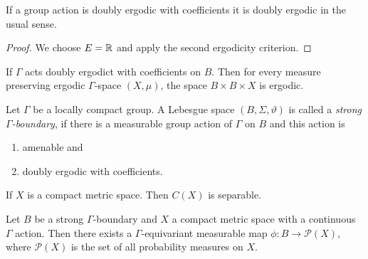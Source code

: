 \begin{prop}
  If a group action is doubly ergodic with coefficients it is doubly ergodic in the usual sense.
\end{prop}

\begin{proof}
  We choose \(E = \mathbb{R}\) and apply the second ergodicity criterion.
\end{proof}

\begin{lemma}
  \label{lem:coeff-product}
  If \(\Gamma\) acts doubly ergodict with coefficients on \(B\). Then for every measure preserving ergodic \(\Gamma\)-space \((X, \mu)\), the space \(B \times B \times X\) is ergodic.
\end{lemma}

\begin{defin}
  Let \(\Gamma\) be a locally compact group. A Lebesgue space \((B, \Sigma, \vartheta)\) is called a \emph{strong \(\Gamma\)-boundary}, if there is a measurable group action of \(\Gamma\) on \(B\) and this action is
  \begin{enumerate}
  \item amenable and
  \item doubly ergodic with coefficients.
  \end{enumerate}
\end{defin}

\begin{lemma}
  If \(X\) is a compact metric space. Then \(C(X)\) is separable.
\end{lemma}

\begin{thm}
  Let \(B\) be a strong \(\Gamma\)-boundary and \(X\) a compact metric space with a continuous \(\Gamma\) action. Then there exists a \(\Gamma\)-equivariant measurable map \(\phi \colon B \to \mathcal{P}(X)\), where \(\mathcal{P}(X)\) is the set of all probability measures on \(X\).
\end{thm}

